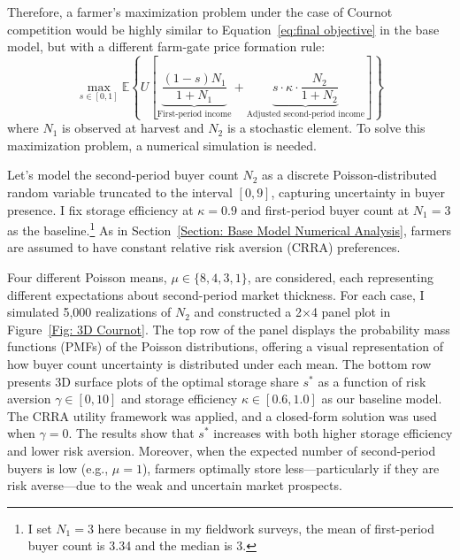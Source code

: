 Therefore, a farmer's maximization problem under the case of Cournot competition would be highly similar to Equation~\ref{eq:final objective} in the base model, but with a different farm-gate price formation rule:
\begin{equation}
\label{eq:Cournot objective function}
\max_{s \in [0,1]} \mathbb{E} \left\{U\left[\underbrace{\frac{(1-s)N_1}{1+N_1}}_{\text{First-period income}} + \underbrace{ s \cdot \kappa \cdot \frac{N_2}{1+N_2}}_{\text{Adjusted second-period income}} \right]\right\}
\end{equation}
where $N_1$ is observed at harvest and $N_2$ is a stochastic element. To solve this maximization problem, a numerical simulation is needed.


Let's model the second-period buyer count $N_2$ as a discrete Poisson-distributed random variable truncated to the interval $[0,9]$, capturing uncertainty in buyer presence.  I fix storage efficiency at $\kappa = 0.9$ and first-period buyer count at $N_1 = 3$ as the baseline.\footnote{I set $N_1=3$ here because in my fieldwork surveys, the mean of first-period buyer count is 3.34 and the median is 3.} As in Section~\ref{Section: Base Model Numerical Analysis}, farmers are assumed to have constant relative risk aversion (CRRA) preferences.

Four different Poisson means, $\mu \in \{8, 4, 3, 1\}$, are considered, each representing different expectations about second-period market thickness. For each case, I simulated 5,000 realizations of $N_2$ and constructed a 2×4 panel plot in Figure~\ref{Fig: 3D Cournot}. The top row of the panel displays the probability mass functions (PMFs) of the Poisson distributions, offering a visual representation of how buyer count uncertainty is distributed under each mean. The bottom row presents 3D surface plots of the optimal storage share $s^*$ as a function of risk aversion $\gamma \in [0,10]$ and storage efficiency $\kappa \in [0.6, 1.0]$ as our baseline model. The CRRA utility framework was applied, and a closed-form solution was used when $\gamma = 0$. The results show that $s^*$ increases with both higher storage efficiency and lower risk aversion. Moreover, when the expected number of second-period buyers is low (e.g., $\mu = 1$), farmers optimally store less—particularly if they are risk averse—due to the weak and uncertain market prospects.

